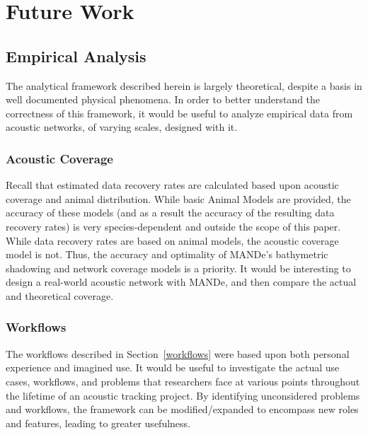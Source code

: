 \section{Future Work}
\subsection{Empirical  Analysis}
The analytical framework described herein is largely theoretical, despite a basis in well documented physical phenomena.  In order to better understand the correctness of this framework, it would be useful to analyze empirical data from acoustic networks, of varying scales, designed with it.

\subsubsection{Acoustic Coverage}
Recall that estimated data recovery rates are calculated based upon acoustic coverage and animal distribution.  While basic Animal Models are provided, the accuracy of these models (and as a result the accuracy of the resulting data recovery rates) is very species-dependent and outside the scope of this paper.  While data recovery rates are based on animal models, the acoustic coverage model is not.  Thus, the accuracy and optimality of MANDe's bathymetric shadowing and network coverage models is a priority.  It would be interesting to design a real-world acoustic network with MANDe, and then compare the actual and theoretical coverage.

\subsubsection{Workflows}
The workflows described in Section~\ref{workflows} were based upon both personal experience and imagined use.  It would be useful to investigate the actual use cases, workflows, and problems that researchers face at various points throughout the lifetime of an acoustic tracking project.  By identifying unconsidered problems and workflows, the framework can be modified/expanded to encompass new roles and features, leading to greater usefulness.

